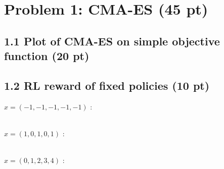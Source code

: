 \documentclass[12pt]{article}
\begin{document}
\newpage
\section*{Problem 1: CMA-ES (45 pt)}
\subsection*{1.1 Plot of CMA-ES on simple objective function (20 pt)}
\begin{tcolorbox}[fit,height=30em, width=40em, blank, borderline={1pt}{1pt},nobeforeafter]
            \begin{center}
            \end{center}
            \end{tcolorbox}
            
\subsection*{1.2 RL reward of fixed policies (10 pt)}

$x = (-1, -1, -1, -1, -1)$ : \begin{tcolorbox}[fit,height=1cm, width=5cm, blank, borderline={1pt}{1pt},nobeforeafter]
    \begin{center}
    \vspace{3mm}
    \large{}
    \end{center}
\end{tcolorbox} \\
$x = (1, 0, 1, 0, 1)$ : \hspace{3.5em} \begin{tcolorbox}[fit,height=1cm, width=5cm, blank, borderline={1pt}{1pt},nobeforeafter]
    \begin{center}
    \vspace{3mm}
    \large{}
    \end{center}
\end{tcolorbox} \\
$x = (0, 1, 2, 3, 4)$ : \hspace{3.5em} \begin{tcolorbox}[fit,height=1cm, width=5cm, blank, borderline={1pt}{1pt},nobeforeafter]
    \begin{center}
    \vspace{3mm}
    \large{}
    \end{center}
\end{tcolorbox}
\end{document}
